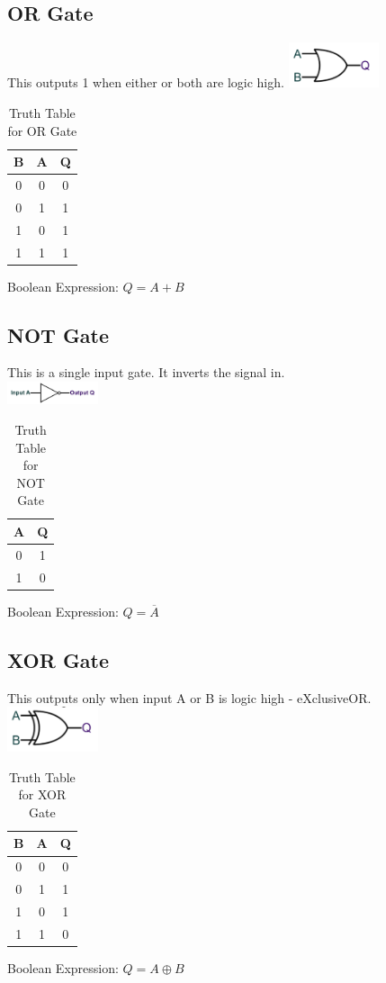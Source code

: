 \documentclass[a4paper,11pt, twocolumn]{article}
\begin{document}
\subsection{OR Gate}
This outputs 1 when either or both are logic high.
\includegraphics[width=0.2\textwidth]{orGate.PNG}
\begin{table}[H]
    \centering
    \begin{tabularx}{0.127\textwidth}{c|c|c}
    B & A & Q \\
    \hline
    0 & 0 & 0 \\
    0 & 1 & 1 \\
    1 & 0 & 1 \\
    1 & 1 & 1
    \end{tabularx}
    \caption{Truth Table for OR Gate}
\end{table}
Boolean Expression: $Q=A+B$
\subsection{NOT Gate}
This is a single input gate. It inverts the signal in.\\
\includegraphics[width=0.2\textwidth]{notGate.PNG}
\begin{table}[H]
    \centering
    \begin{tabularx}{0.085\textwidth}{c|c}
    A & Q \\
    \hline
    0 & 1 \\
    1 & 0 \\
    \end{tabularx}
    \caption{Truth Table for NOT Gate}
\end{table}
Boolean Expression: $Q=\overline{A}$
\subsection{XOR Gate}
This outputs only when input A or B is logic high - eXclusiveOR.\\
\includegraphics[width=0.2\textwidth]{xorGate.PNG}\\
\begin{table}[H]
    \centering
    \begin{tabularx}{0.127\textwidth}{c|c|c}
    B & A & Q \\
    \hline
    0 & 0 & 0 \\
    0 & 1 & 1 \\
    1 & 0 & 1 \\
    1 & 1 & 0
    \end{tabularx}
    \caption{Truth Table for XOR Gate}
\end{table}
Boolean Expression: $Q = A \oplus B $
\end{document}
